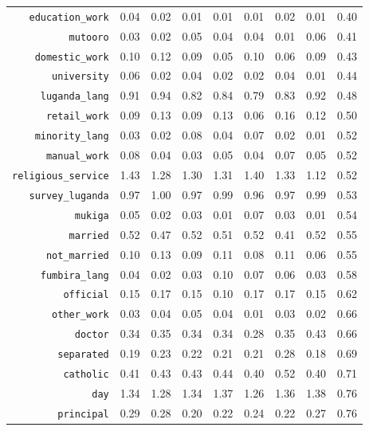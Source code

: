 \begin{longtable}{rrrrrrrrr}
  {\texttt{education\_work}} & 0.04 & 0.02 & 0.01 & 0.01 & 0.01 & 0.02 & 0.01 & 0.40 \\ 
  {\texttt{mutooro}} & 0.03 & 0.02 & 0.05 & 0.04 & 0.04 & 0.01 & 0.06 & 0.41 \\ 
  {\texttt{domestic\_work}} & 0.10 & 0.12 & 0.09 & 0.05 & 0.10 & 0.06 & 0.09 & 0.43 \\ 
  {\texttt{university}} & 0.06 & 0.02 & 0.04 & 0.02 & 0.02 & 0.04 & 0.01 & 0.44 \\ 
  {\texttt{luganda\_lang}} & 0.91 & 0.94 & 0.82 & 0.84 & 0.79 & 0.83 & 0.92 & 0.48 \\ 
  {\texttt{retail\_work}} & 0.09 & 0.13 & 0.09 & 0.13 & 0.06 & 0.16 & 0.12 & 0.50 \\ 
  {\texttt{minority\_lang}} & 0.03 & 0.02 & 0.08 & 0.04 & 0.07 & 0.02 & 0.01 & 0.52 \\ 
  {\texttt{manual\_work}} & 0.08 & 0.04 & 0.03 & 0.05 & 0.04 & 0.07 & 0.05 & 0.52 \\ 
  {\texttt{religious\_service}} & 1.43 & 1.28 & 1.30 & 1.31 & 1.40 & 1.33 & 1.12 & 0.52 \\ 
  {\texttt{survey\_luganda}} & 0.97 & 1.00 & 0.97 & 0.99 & 0.96 & 0.97 & 0.99 & 0.53 \\ 
  {\texttt{mukiga}} & 0.05 & 0.02 & 0.03 & 0.01 & 0.07 & 0.03 & 0.01 & 0.54 \\ 
  {\texttt{married}} & 0.52 & 0.47 & 0.52 & 0.51 & 0.52 & 0.41 & 0.52 & 0.55 \\ 
  {\texttt{not\_married}} & 0.10 & 0.13 & 0.09 & 0.11 & 0.08 & 0.11 & 0.06 & 0.55 \\ 
  {\texttt{fumbira\_lang}} & 0.04 & 0.02 & 0.03 & 0.10 & 0.07 & 0.06 & 0.03 & 0.58 \\ 
  {\texttt{official}} & 0.15 & 0.17 & 0.15 & 0.10 & 0.17 & 0.17 & 0.15 & 0.62 \\ 
  {\texttt{other\_work}} & 0.03 & 0.04 & 0.05 & 0.04 & 0.01 & 0.03 & 0.02 & 0.66 \\ 
  {\texttt{doctor}} & 0.34 & 0.35 & 0.34 & 0.34 & 0.28 & 0.35 & 0.43 & 0.66 \\ 
  {\texttt{separated}} & 0.19 & 0.23 & 0.22 & 0.21 & 0.21 & 0.28 & 0.18 & 0.69 \\ 
  {\texttt{catholic}} & 0.41 & 0.43 & 0.43 & 0.44 & 0.40 & 0.52 & 0.40 & 0.71 \\ 
  {\texttt{day}} & 1.34 & 1.28 & 1.34 & 1.37 & 1.26 & 1.36 & 1.38 & 0.76 \\ 
  {\texttt{principal}} & 0.29 & 0.28 & 0.20 & 0.22 & 0.24 & 0.22 & 0.27 & 0.76 \\ 

\end{longtable}
